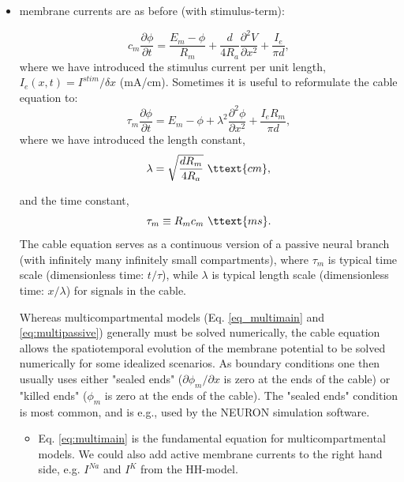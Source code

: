 \begin{itemize}
\item membrane currents are as before (with stimulus-term):


\begin{equation}
c_m \frac{\partial \phi}{\partial t} = \frac{E_m-\phi}{R_m} +  \frac{d}{4 R_a}  \frac{\partial^2 V}{\partial x^2}  + \frac{I_e}{\pi d},
\label{eq:cable}
\end{equation}
where we have introduced the stimulus current per unit length, $I_e(x,t) = I^{stim}/\delta x$ (mA/cm). Sometimes it is useful to reformulate the cable equation to:
\begin{equation}
\tau_m \frac{\partial \phi}{\partial t} = E_m-\phi +   \lambda^2  \frac{\partial^2 \phi}{\partial x^2}  + \frac{I_e R_m}{\pi d},
\label{eq:cable2}
\end{equation}
where we have introduced the length constant,
\begin{equation}
\lambda = \sqrt{\frac{d R_m}{4 R_a}} \,\, \ttext{cm}, 
\label{eq:lengthconst}
\end{equation}

and the time constant, 
\begin{equation}
\tau_m \equiv R_m c_m  \,\, \ttext{ms}.
\label{eq:lengthconst}
\end{equation}
The cable equation serves as a continuous version of a passive neural branch (with infinitely many infinitely small compartments), 
where $\tau_m$ is typical time scale (dimensionless time: $t/\tau$), while $\lambda$  is typical length scale  (dimensionless time: $x/\lambda$) for signals in the cable. 

Whereas multicompartmental models (Eq. \ref{eq_multimain} and \ref{eq:multipassive}) generally must be solved numerically, the cable equation allows the spatiotemporal evolution of the membrane potential to be solved numerically for some idealized scenarios. As boundary conditions one then usually uses either "sealed ends" ($\partial \phi_m/\partial x$ is zero at the ends of the cable) or "killed ends" ($\phi_m$ is zero at the ends of the cable). The "sealed ends" condition is most common, and is e.g., used by the NEURON simulation software. 

\begin{itemize}
\item Eq. \ref{eq:multimain} is the fundamental equation for multicompartmental models. We could also add active membrane currents to the right hand side, e.g. $I^{Na}$ and $I^K$ from the HH-model.



\end{itemize}
\end{itemize}
